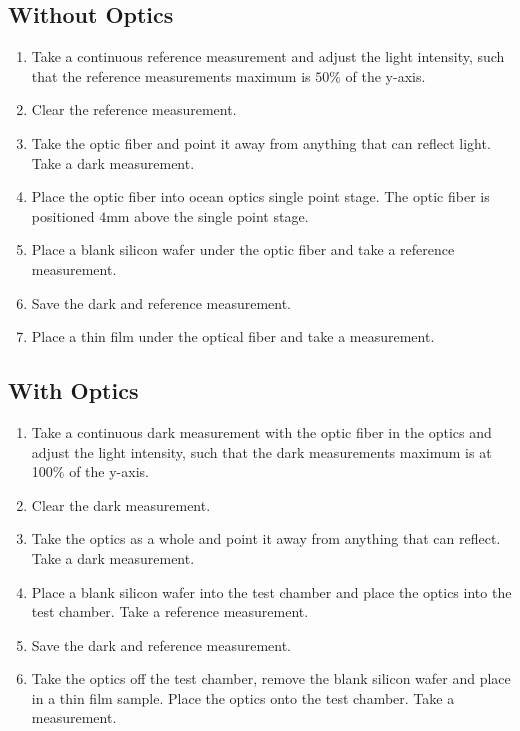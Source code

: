 \documentclass[MasterThesisMain.tex]{subfiles}
\begin{document}
\subsection{Without Optics}
\begin{enumerate}
\item Take a continuous reference measurement and adjust the light intensity, such that the reference measurements maximum is $50\%$ of the y-axis.
\item Clear the reference measurement.
\item Take the optic fiber and point it away from anything that can reflect light. Take a dark measurement.
\item Place the optic fiber into ocean optics single point stage. The optic fiber is positioned $4$mm above the single point stage.
\item Place a blank silicon wafer under the optic fiber and take a reference measurement.
\item Save the dark and reference measurement.
\item Place a thin film under the optical fiber and take a measurement.  
\end{enumerate}

\subsection{With Optics}
\begin{enumerate}
\item Take a continuous dark measurement with the optic fiber in the optics and adjust the light intensity, such that the dark measurements maximum is at 100$\%$ of the y-axis.
\item Clear the dark measurement.
\item Take the optics as a whole and point it away from anything that can reflect. Take a dark measurement.
\item Place a blank silicon wafer into the test chamber and place the optics into the test chamber. Take a reference measurement.
\item Save the dark and reference measurement.
\item Take the optics off the test chamber, remove the blank silicon wafer and place in a thin film sample. Place the optics onto the test chamber. Take a measurement.
\end{enumerate}
\end{document}
